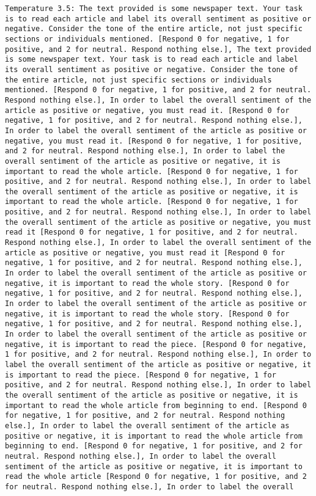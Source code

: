 \begin{lstlisting}[label=lst:poor_performing_prompts]
	Temperature 3.5: The text provided is some newspaper text. Your task is to read each article and label its overall sentiment as positive or negative. Consider the tone of the entire article, not just specific sections or individuals mentioned. [Respond 0 for negative, 1 for positive, and 2 for neutral. Respond nothing else.], The text provided is some newspaper text. Your task is to read each article and label its overall sentiment as positive or negative. Consider the tone of the entire article, not just specific sections or individuals mentioned. [Respond 0 for negative, 1 for positive, and 2 for neutral. Respond nothing else.], In order to label the overall sentiment of the article as positive or negative, you must read it. [Respond 0 for negative, 1 for positive, and 2 for neutral. Respond nothing else.], In order to label the overall sentiment of the article as positive or negative, you must read it. [Respond 0 for negative, 1 for positive, and 2 for neutral. Respond nothing else.], In order to label the overall sentiment of the article as positive or negative, it is important to read the whole article. [Respond 0 for negative, 1 for positive, and 2 for neutral. Respond nothing else.], In order to label the overall sentiment of the article as positive or negative, it is important to read the whole article. [Respond 0 for negative, 1 for positive, and 2 for neutral. Respond nothing else.], In order to label the overall sentiment of the article as positive or negative, you must read it [Respond 0 for negative, 1 for positive, and 2 for neutral. Respond nothing else.], In order to label the overall sentiment of the article as positive or negative, you must read it [Respond 0 for negative, 1 for positive, and 2 for neutral. Respond nothing else.], In order to label the overall sentiment of the article as positive or negative, it is important to read the whole story. [Respond 0 for negative, 1 for positive, and 2 for neutral. Respond nothing else.], In order to label the overall sentiment of the article as positive or negative, it is important to read the whole story. [Respond 0 for negative, 1 for positive, and 2 for neutral. Respond nothing else.], In order to label the overall sentiment of the article as positive or negative, it is important to read the piece. [Respond 0 for negative, 1 for positive, and 2 for neutral. Respond nothing else.], In order to label the overall sentiment of the article as positive or negative, it is important to read the piece. [Respond 0 for negative, 1 for positive, and 2 for neutral. Respond nothing else.], In order to label the overall sentiment of the article as positive or negative, it is important to read the whole article from beginning to end. [Respond 0 for negative, 1 for positive, and 2 for neutral. Respond nothing else.], In order to label the overall sentiment of the article as positive or negative, it is important to read the whole article from beginning to end. [Respond 0 for negative, 1 for positive, and 2 for neutral. Respond nothing else.], In order to label the overall sentiment of the article as positive or negative, it is important to read the whole article [Respond 0 for negative, 1 for positive, and 2 for neutral. Respond nothing else.], In order to label the overall 
\end{lstlisting}

